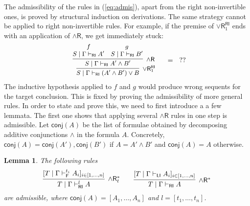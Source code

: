 \documentclass[submission,copyright,creativecommons]{eptcs}
\newtheorem{lemma}[theorem]{Lemma}
\theoremstyle{definition}
\newtheorem{defn}{Definition}[section]
\newcommand{\andr}{\land \mathsf{R}}
\newcommand{\orrone}{\lor \mathsf{R}_{1}}
\newcommand{\RI}{\mathsf{RI}}
\newcommand{\LI}{\mathsf{LI}}
\newcommand{\F}{\mathsf{F}}
\newcommand{\conj}[1]{\mathsf{conj} (#1)}
\newcommand{\proofbox}[1]{\begin{tabular}{l} #1 \end{tabular}}
\newcommand\niccolo[1]{\mbox{}
{\marginpar{\color{red}NV}}
{\sf\noindent\color{red}#1}}%
\begin{document}
The admissibility of the rules in (\ref{eq:admis}), apart from the right non-invertible ones, is proved by structural induction on derivations.
The same strategy cannot be applied to right non-invertible rules.
For example, if the premise of $\orrone^{\RI}$ ends with an application of $\andr$, we get immediately stuck:
\begin{displaymath}
  \begin{array}{c}
    \small
    \proofbox{
    \infer[\orrone^{\RI}]{S \mid \Gamma \vdash_{\RI} (A' \land B') \lor B}{
      \infer[\andr]{S \mid \Gamma \vdash_{\RI} A' \land B'}{
        \deduce{S \mid \Gamma \vdash_{\RI} A'}{f}
        &
        \deduce{S \mid \Gamma \vdash_{\RI} B'}{g}
      }
    }
    }
    \quad
    =
    \quad
    ??
  \end{array}
\end{displaymath}
The inductive hypothesis applied to $f$ and $g$ would produce wrong sequents for the target conclusion.
This is fixed by proving the admissibility of more general rules. In order to state and prove this, we need to first introduce a a few lemmata. 
The first one shows that applying several $\andr$ rules in one step is admissible.
  Let $\conj{A}$ be the list of formulae obtained by decomposing additive conjunctions $\land$ in the formula $A$. Concretely, $\conj{A} = \conj{A'} , \conj{B'}$ if $A = A' \land B'$ and $\conj{A} = A$ otherwise.
\begin{lemma}\label{lem:BigStep}
  The following rules
  \begin{displaymath}
    \infer[\andr^{*}_t]{T \mid \Gamma \vdash^{l}_{\RI} A}{
      [T \mid \Gamma \vdash^{t_i}_{\F} A_i]_{i \in [1 , \dots , n]}
    }
    \qquad
    \infer[\andr^{*}]{T \mid \Gamma \vdash_{\RI} A}{
      [T \mid \Gamma \vdash_{\LI} A_i]_{i \in [1 , \dots , n]}
    }
  \end{displaymath}
  are admissible, where $\conj{A} = [A_1 , \dots , A_n]$ and $l = [t_1 , \dots , t_n]$.
\end{lemma}
\end{document}
